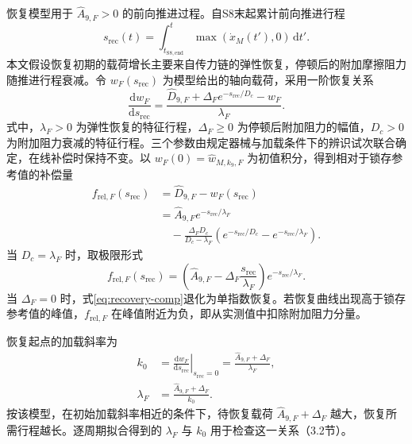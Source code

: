 \documentclass{JQR_LaTeX_Template-0507/JQRnew}
\begin{document}
恢复模型用于 $\widehat A_{9,F}>0$ 的前向推进过程。自S8末起累计前向推进行程
\begin{equation}
\label{eq:recovery-travel}
s_{\mathrm{rec}}(t)=\int_{t_{\mathrm{S8,end}}}^{t}
\max\!\left(\dot x_M(t'),0\right)\,\mathrm dt'.
\end{equation}
本文假设恢复初期的载荷增长主要来自传力链的弹性恢复，停顿后的附加摩擦阻力随推进行程衰减。令 $w_F(s_{\mathrm{rec}})$ 为模型给出的轴向载荷，采用一阶恢复关系
\begin{equation}
\label{eq:recovery-ode}
\frac{\mathrm dw_F}{\mathrm ds_{\mathrm{rec}}}
=\frac{\widehat D_{9,F}+\Delta_F e^{-s_{\mathrm{rec}}/D_c}-w_F}{\lambda_F}.
\end{equation}
式中，$\lambda_F>0$ 为弹性恢复的特征行程，$\Delta_F\ge0$ 为停顿后附加阻力的幅值，$D_c>0$ 为附加阻力衰减的特征行程。三个参数由规定器械与加载条件下的辨识试次联合确定，在线补偿时保持不变。以 $w_F(0)=\widehat w_{M,k_9,F}$ 为初值积分，得到相对于锁存参考值的补偿量
\begin{equation}
\label{eq:recovery-comp}
\begin{aligned}
f_{\mathrm{rel},F}(s_{\mathrm{rec}})&=\widehat D_{9,F}-w_F(s_{\mathrm{rec}})\\
&=\widehat A_{9,F}e^{-s_{\mathrm{rec}}/\lambda_F}\\
&\quad-\frac{\Delta_FD_c}{D_c-\lambda_F}
\left(e^{-s_{\mathrm{rec}}/D_c}-e^{-s_{\mathrm{rec}}/\lambda_F}\right).
\end{aligned}
\end{equation}
当 $D_c=\lambda_F$ 时，取极限形式
\begin{equation}
\label{eq:equal-scales}
f_{\mathrm{rel},F}(s_{\mathrm{rec}})=
\left(\widehat A_{9,F}-\Delta_F\frac{s_{\mathrm{rec}}}{\lambda_F}\right)e^{-s_{\mathrm{rec}}/\lambda_F}.
\end{equation}
当 $\Delta_F=0$ 时，式\eqref{eq:recovery-comp}退化为单指数恢复。若恢复曲线出现高于锁存参考值的峰值，$f_{\mathrm{rel},F}$ 在峰值附近为负，即从实测值中扣除附加阻力分量。

恢复起点的加载斜率为
\begin{equation}
\label{eq:initial-slope}
\begin{aligned}
k_0&=\left.\frac{\mathrm dw_F}{\mathrm ds_{\mathrm{rec}}}\right|_{s_{\mathrm{rec}}=0}
=\frac{\widehat A_{9,F}+\Delta_F}{\lambda_F},\\
\lambda_F&=\frac{\widehat A_{9,F}+\Delta_F}{k_0}.
\end{aligned}
\end{equation}
按该模型，在初始加载斜率相近的条件下，待恢复载荷 $\widehat A_{9,F}+\Delta_F$ 越大，恢复所需行程越长。逐周期拟合得到的 $\lambda_F$ 与 $k_0$ 用于检查这一关系（3.2节）。
\end{document}
